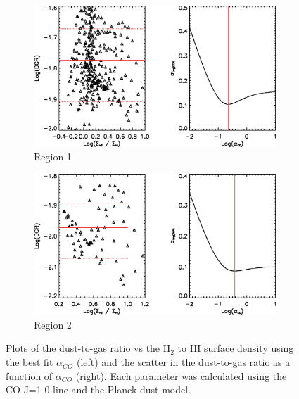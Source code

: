\begin{figure}%
  \begin{subfigure}[t]{1\textwidth}
    \centering
    \includegraphics[width=1.\textwidth]{dgr_imgs/region_1_aco_output_10f.eps}
    \caption{Region 1}
  \end{subfigure}

  \begin{subfigure}[t]{1\textwidth}
    \centering
    \includegraphics[width=1.\textwidth]{dgr_imgs/region_2_aco_output_10f.eps}
    \caption{Region 2}
  \end{subfigure}
   \caption[Dust-to-Gas Ratio Determination Plots for CO J=1-0]{Plots of the dust-to-gas ratio vs the H$_2$ to HI surface density using the best fit $\alpha_{CO}$ (left) and the scatter in the dust-to-gas ratio as a function of $\alpha_{CO}$ (right).  Each parameter was calculated using the CO J=1-0 line and the Planck dust model.}
   \label{fig:dgr_co10}
\end{figure}

